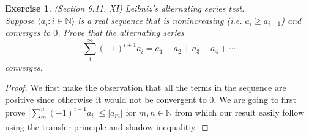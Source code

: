 \documentclass[a4paper, 11pt, openany]{book}
\theoremstyle{plain}
\newtheorem{exercise}{Exercise}[chapter]
\theoremstyle{plain}
\newcommand{\N}{\mathbb{N}}
\newcommand{\la}{\langle}
\newcommand{\ra}{\rangle}
\begin{document}
  \begin{exercise}
    (Section 6.11, XI) Leibniz's alternating series test. \\
    Suppose $\la a_i: i \in \N \ra$ is a real sequence that is nonincreasing (i.e. $a_i \geq a_{i+1}$) and converges to $0$. Prove that the alternating series $$\sum_{1}^\infty (-1)^{i+1} a_i=a_1-a_2+a_3-a_4+\cdots $$ converges. 
  \end{exercise}
  \begin{proof}
    We first make the observation that all the terms in the sequence are positive since otherwise it would not be convergent to $0$. We are going to first prove $\left| \sum_{m}^n (-1)^{i+1} a_i \right| \leq |a_m|$ for $m,n \in \N$ from which our result easily follow using the transfer principle and shadow inequalitiy. 


\end{proof}
\end{document}
